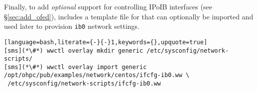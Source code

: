 
\noindent Finally, to add {\em optional} support for controlling IPoIB
interfaces (see \S\ref{sec:add_ofed}), \OHPC{} includes a
template file for \Warewulf{} that can optionally be imported and used later to provision
\texttt{ib0} network settings.

\begin{lstlisting}[language=bash,literate={-}{-}1,keywords={},upquote=true]
[sms](*\#*) wwctl overlay mkdir generic /etc/sysconfig/network-scripts/
[sms](*\#*) wwctl overlay import generic /opt/ohpc/pub/examples/network/centos/ifcfg-ib0.ww \
 /etc/sysconfig/network-scripts/ifcfg-ib0.ww
\end{lstlisting}

